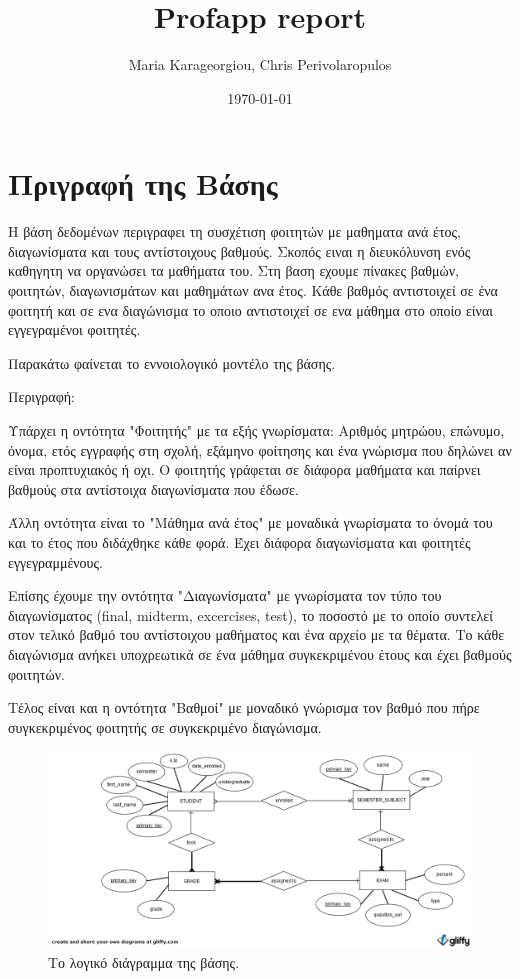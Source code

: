 \documentclass[11pt,a4paper]{article}
\author{Maria Karageorgiou, Chris Perivolaropulos}
\date{\today}
\title{Profapp report}
\begin{document}
\maketitle
\tableofcontents


\section{Πριγραφή της Βάσης}
\label{sec-1}
Η βάση δεδομένων περιγραφει τη συσχέτιση φοιτητών με μαθηματα
ανά έτος, διαγωνίσματα και τους αντίστοιχους βαθμούς. Σκοπός ειναι η
διευκόλυνση ενός καθηγητη να οργανώσει τα μαθήματα του. Στη βαση
εχουμε πίνακες βαθμών, φοιτητών, διαγωνισμάτων και μαθημάτων ανα
έτος. Κάθε βαθμός αντιστοιχεί σε ένα φοιτητή και σε ενα
διαγώνισμα το οποιο αντιστοιχεί σε ενα μάθημα στο οποίο είναι
εγγεγραμένοι φοιτητές.

Παρακάτω φαίνεται το εννοιολογικό μοντέλο της βάσης.

Περιγραφή:

Υπάρχει η οντότητα "Φοιτητής" με τα εξής γνωρίσματα: Αριθμός
μητρώου, επώνυμο, όνομα, ετός εγγραφής στη σχολή, εξάμηνο φοίτησης
και ένα γνώρισμα που δηλώνει αν είναι προπτυχιακός ή οχι. Ο φοιτητής
γράφεται σε διάφορα μαθήματα και παίρνει βαθμούς στα αντίστοιχα
διαγωνίσματα που έδωσε.

Άλλη οντότητα είναι το "Μάθημα ανά έτος" με μοναδικά γνωρίσματα το
όνομά του και το έτος που διδάχθηκε κάθε φορά. Έχει διάφορα
διαγωνίσματα και φοιτητές εγγεγραμμένους.

Επίσης έχουμε την οντότητα "Διαγωνίσματα" με γνωρίσματα τον τύπο του
διαγωνίσματος (final, midterm, excercises, test), το ποσοστό με το
οποίο συντελεί στον τελικό βαθμό του αντίστοιχου μαθήματος και ένα
αρχείο με τα θέματα. Το κάθε διαγώνισμα ανήκει υποχρεωτικά σε ένα
μάθημα συγκεκριμένου έτους και έχει βαθμούς φοιτητών.

Τέλος είναι και η οντότητα "Βαθμοί" με μοναδικό γνώρισμα τον βαθμό
που πήρε συγκεκριμένος φοιτητής σε συγκεκριμένο διαγώνισμα.

\begin{figure}[H]
\centering
\includegraphics[width=.9\linewidth]{./profapp.png}
\caption{\label{fig:profapp_erd.png}Το λογικό διάγραμμα της βάσης.}
\end{figure}
\end{document}
